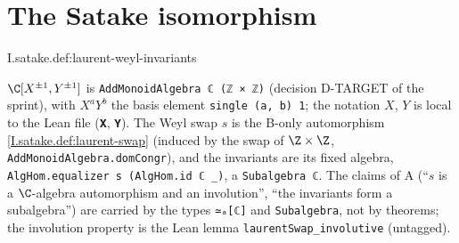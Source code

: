 \section{The Satake isomorphism}

\begin{definition}
\end{definition}
\begin{tfformal}{I.satake.def:laurent-weyl-invariants}
\begin{tffidelity}
$\C[X^{\pm1},Y^{\pm1}]$ is \texttt{AddMonoidAlgebra ℂ (ℤ × ℤ)} (decision D-TARGET of the sprint), with $X^aY^b$ the basis element \texttt{single (a, b) 1}; the notation $X$, $Y$ is local to the Lean file (\texttt{𝐗}, \texttt{𝐘}). The Weyl swap $s$ is the B-only automorphism \cref{I.satake.def:laurent-swap} (induced by the swap of $\Z\times\Z$, \texttt{AddMonoidAlgebra.domCongr}), and the invariants are its fixed algebra, \texttt{AlgHom.equalizer s (AlgHom.id ℂ \_)}, a \texttt{Subalgebra ℂ}. The claims of A (``$s$ is a $\C$-algebra automorphism and an involution'', ``the invariants form a subalgebra'') are carried by the types \texttt{≃ₐ[ℂ]} and \texttt{Subalgebra}, not by theorems; the involution property is the Lean lemma \texttt{laurentSwap\_involutive} (untagged).
\end{tffidelity}
\end{tfformal}

